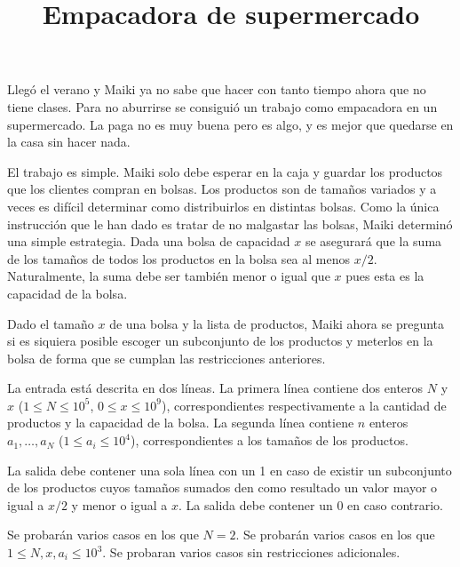 \documentclass{oci}
\title{Empacadora de supermercado}
\begin{document}
\begin{problemDescription}
Llegó el verano y Maiki ya no sabe que hacer con tanto tiempo ahora que no tiene clases.
Para no aburrirse se consiguió un trabajo como empacadora en un supermercado.
La paga no es muy buena pero es algo, y es mejor que quedarse en la casa sin hacer nada.

El trabajo es simple.
Maiki solo debe esperar en la caja y guardar los productos que los clientes compran en bolsas.
Los productos son de tamaños variados y a veces es difícil determinar como distribuirlos
en distintas bolsas.
Como la única instrucción que le han dado es tratar de no malgastar las bolsas,
Maiki determinó una simple estrategia.
Dada una bolsa de capacidad $x$ se asegurará que la suma de los tamaños de todos los productos
en la bolsa sea al menos $x/2$.
Naturalmente, la suma debe ser también menor o igual que $x$ pues esta es la capacidad
de la bolsa.

Dado el tamaño $x$ de una bolsa y la lista de productos, Maiki ahora se pregunta si es siquiera
posible escoger un subconjunto de los productos y meterlos en la bolsa de forma que se cumplan
las restricciones anteriores.

\end{problemDescription}

\begin{inputDescription}
La entrada está descrita en dos líneas.
La primera línea contiene dos enteros $N$ y $x$ ($1\leq N\leq 10^5$, $0 \leq x \leq 10^9$),
correspondientes respectivamente a la cantidad de productos y la capacidad de la bolsa.
La segunda línea contiene $n$ enteros $a_1,\ldots, a_N$ ($1\leq a_i\leq 10^4$), correspondientes
a los tamaños de los productos.
\end{inputDescription}

\begin{outputDescription}
La salida debe contener una sola línea con un 1 en caso de existir un subconjunto de los productos
cuyos tamaños sumados den como resultado un valor mayor o igual a $x/2$ y menor o igual a $x$. 
La salida debe contener un 0 en caso contrario.
\end{outputDescription}

\begin{scoreDescription}
  Se probarán varios casos en los que $N = 2$.
  Se probarán varios casos en los que $1 \leq N, x, a_i \leq 10^3$.
  Se probaran varios casos sin restricciones adicionales.
\end{scoreDescription}

\begin{sampleDescription}
\end{sampleDescription}
\end{document}
